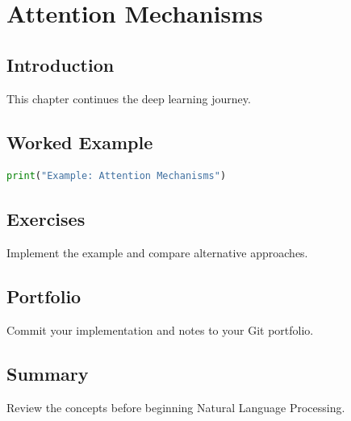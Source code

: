 \chapter{Attention Mechanisms}
\label{chap:vol7-13}



\section{Introduction}
This chapter continues the deep learning journey.

\section{Worked Example}
\begin{lstlisting}[language=Python]
print("Example: Attention Mechanisms")
\end{lstlisting}

\section{Exercises}
\begin{exercise}
Implement the example and compare alternative approaches.
\end{exercise}

\section{Portfolio}
Commit your implementation and notes to your Git portfolio.

\section{Summary}
Review the concepts before beginning Natural Language Processing.
